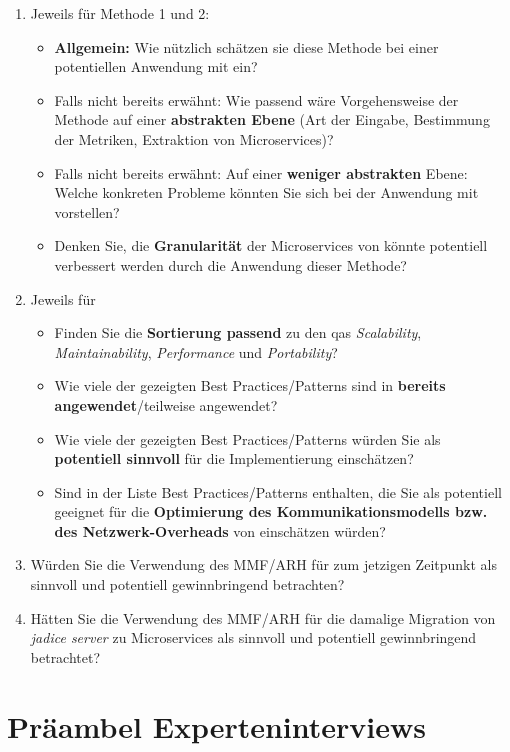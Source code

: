 \begin{enumerate}
	\item Jeweils für Methode 1 und 2:
	\begin{itemize}
		\item \textbf{Allgemein:} Wie nützlich schätzen sie diese Methode bei einer potentiellen Anwendung mit \jf ein?
		\item Falls nicht bereits erwähnt: Wie passend wäre Vorgehensweise der Methode auf einer \textbf{abstrakten Ebene} (Art der Eingabe, Bestimmung der Metriken, Extraktion von Microservices)?
		\item Falls nicht bereits erwähnt: Auf einer \textbf{weniger abstrakten} Ebene: Welche konkreten Probleme könnten Sie sich bei der Anwendung mit \jf vorstellen?
		\item Denken Sie, die \textbf{Granularität} der Microservices von \jf könnte potentiell verbessert werden durch die Anwendung dieser Methode?
	\end{itemize}
	\item  Jeweils für \bpp
	\begin{itemize}
		\item Finden Sie die \textbf{Sortierung passend} zu den \glspl{qa} \emph{Scalability}, \emph{Maintainability}, \emph{Performance} und \emph{Portability}?
		\item Wie viele der gezeigten Best Practices/Patterns sind in \jf  \textbf{bereits angewendet}/teilweise angewendet?
		\item Wie viele der gezeigten Best Practices/Patterns würden Sie als \textbf{potentiell sinnvoll} für die Implementierung einschätzen?
		\item Sind in der Liste Best Practices/Patterns enthalten, die Sie als potentiell geeignet für die \textbf{Optimierung des Kommunikationsmodells bzw. des Netzwerk-Overheads} von \jf einschätzen würden?
	\end{itemize}
	\item Würden Sie die Verwendung des MMF/ARH für \jf zum jetzigen Zeitpunkt als sinnvoll und potentiell gewinnbringend betrachten?
	\item Hätten Sie die Verwendung des MMF/ARH für die damalige Migration von \emph{jadice server} zu Microservices  als sinnvoll und potentiell gewinnbringend betrachtet?
\end{enumerate}





\chapter{Präambel Experteninterviews}
\label{chap:expert-interviews-preamble}

